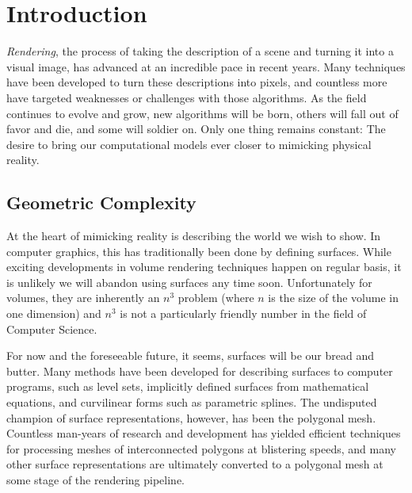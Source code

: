 \documentclass[12pt]{ucthesis}
\begin{document}
\pagestyle{plain}




\renewcommand{\baselinestretch}{1.66}







\chapter{Introduction}
\label{intro}

\emph{Rendering}, the process of taking the description of a scene and turning
it into a visual image, has advanced at an incredible pace in recent
years. Many techniques have been developed to turn these descriptions into
pixels, and countless more have targeted weaknesses or challenges with those
algorithms. As the field continues to evolve and grow, new algorithms will be
born, others will fall out of favor and die, and some will soldier on. Only
one thing remains constant: The desire to bring our computational models ever
closer to mimicking physical reality.

\section{Geometric Complexity}
\label{complexity}

At the heart of mimicking reality is describing the world we wish to show. In
computer graphics, this has traditionally been done by defining surfaces. While
exciting developments in volume rendering techniques happen on regular basis,
it is unlikely we will abandon using surfaces any time soon. Unfortunately for
volumes, they are inherently an $n^3$ problem (where $n$ is the size of the
volume in one dimension) and $n^3$ is not a particularly friendly number in the
field of Computer Science.

For now and the foreseeable future, it seems, surfaces will be our bread and
butter. Many methods have been developed for describing surfaces to computer
programs, such as level sets, implicitly defined surfaces from mathematical
equations, and curvilinear forms such as parametric splines. The undisputed
champion of surface representations, however, has been the polygonal mesh.
Countless man-years of research and development has yielded efficient
techniques for processing meshes of interconnected polygons at blistering
speeds, and many other surface representations are ultimately converted to a
polygonal mesh at some stage of the rendering pipeline.
\end{document}

